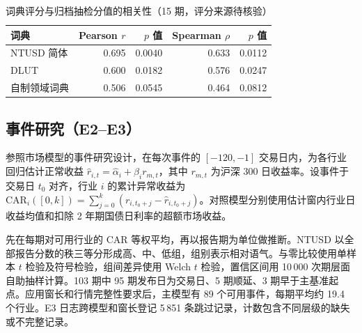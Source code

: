 \begin{table}[htbp]
  \centering\small
  \caption{词典评分与归档抽检分值的相关性（15 期，评分来源待核验）}
  \label{tab:human-agreement}
  \begin{tabular}{@{}lrrrr@{}}
    \toprule
    词典 & Pearson $r$ & $p$ 值 & Spearman $\rho$ & $p$ 值 \\
    \midrule
    NTUSD 简体 & 0.695 & 0.0040 & 0.633 & 0.0112 \\
    DLUT & 0.600 & 0.0182 & 0.576 & 0.0247 \\
    自制领域词典 & 0.506 & 0.0545 & 0.464 & 0.0812 \\
    \bottomrule
  \end{tabular}
\end{table}

\subsection{事件研究（E2--E3）}

参照市场模型的事件研究设计\cite{macKinlay1997}，在每次事件的 $[-120,-1]$ 交易日内，为各行业回归估计正常收益 $\widehat r_{i,t}=\widehat\alpha_i+\widehat\beta_i r_{m,t}$，其中 $r_{m,t}$ 为沪深 300 日收益率。设事件于交易日 $t_0$ 对齐，行业 $i$ 的累计异常收益为 $\mathrm{CAR}_{i}([0,k])=\sum_{j=0}^{k}(r_{i,t_0+j}-\widehat r_{i,t_0+j})$。对照模型分别使用估计窗内行业日收益均值和扣除 2 年期国债日利率的超额市场收益。

先在每期对可用行业的 CAR 等权平均，再以报告期为单位做推断。NTUSD 以全部报告分数的秩三等分形成高、中、低组，组别表示相对语气。与零比较使用单样本 $t$ 检验及符号检验，组间差异使用 Welch $t$ 检验，置信区间用 10\,000 次期层面自助抽样计算。103 期中 95 期发布日为交易日、5 期顺延、3 期早于主基准起点。应用窗长和行情完整性要求后，主模型有 89 个可用事件，每期平均约 19.4 个行业。E3 日志跨模型和窗长登记 5\,851 条跳过记录，计数包含不同层级的缺失或不完整记录。

